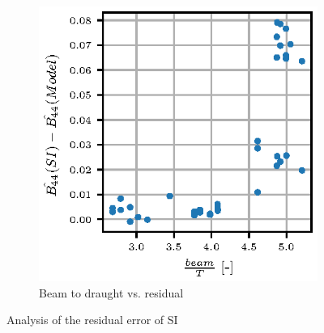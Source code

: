 \begin{figure}[H]
\begin{subfigure}[b]{0.485\textwidth}
        \includegraphics[width=\textwidth]{figures/beam_T_residual.eps}
        \caption{Beam to draught vs. residual}
        \label{fig:beam_T_residual}
    \end{subfigure}
    
    \caption{Analysis of the residual error of SI}\label{fig:validation}
\end{figure}



